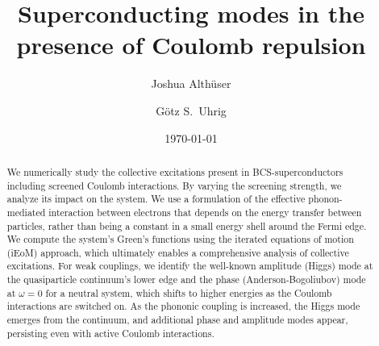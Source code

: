 \documentclass[
    reprint, 
    aps,
    preprintnumbers,
    twocolumn,
    prb,
    superscriptaddress
]{revtex4-2}
\begin{document}
 

\title{Superconducting modes in the presence of Coulomb repulsion}


\author{Joshua Alth\"user}

\author{G\"otz S.~Uhrig}

\date{\today}



\begin{abstract}
  We numerically study the collective excitations present in BCS-superconductors including screened Coulomb interactions.
  By varying the screening strength, we analyze its impact on the system.
  We use a formulation of the effective phonon-mediated interaction between electrons that depends on the energy transfer between particles,
  rather than being a constant in a small energy shell around the Fermi edge.
  We compute the system's Green's functions using the iterated equations of motion (iEoM) approach,
  which ultimately enables a comprehensive analysis of collective excitations.
  For weak couplings, we identify the well-known amplitude (Higgs) mode at the quasiparticle continuum's lower edge
  and the phase (Anderson-Bogoliubov) mode at $\omega = 0$ for a neutral system, which shifts to higher energies as the Coulomb interactions are switched on.
  As the phononic coupling is increased, the Higgs mode emerges from the continuum, and additional phase and amplitude modes appear,
  persisting even with active Coulomb interactions.
\end{abstract}

\maketitle
\end{document}
